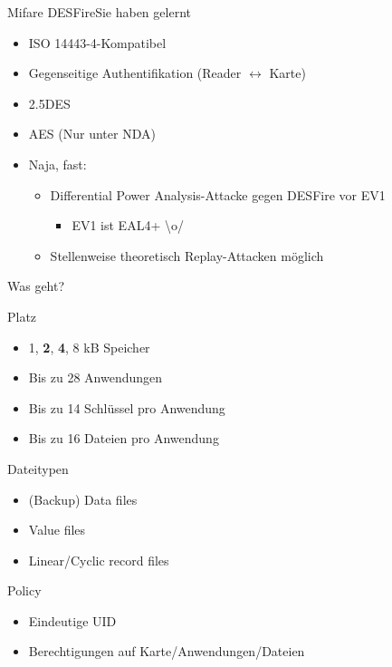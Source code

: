 \documentclass{beamer}
\begin{document}
\begin{frame}{Mifare DESFire}{Sie haben gelernt}
  \begin{itemize}
  \item ISO 14443-4-Kompatibel
  \item Gegenseitige Authentifikation (Reader $\leftrightarrow$ Karte)
  \item 2.5DES
  \item AES (Nur unter NDA)
    \pause
  \item Naja, fast:
    \begin{itemize}
    \item Differential Power Analysis-Attacke gegen DESFire vor EV1
      \begin{itemize}
      \item EV1 ist EAL4+ {\textbackslash}o/
      \end{itemize}
    \item Stellenweise theoretisch Replay-Attacken m\"oglich
    \end{itemize}
  \end{itemize}
\end{frame}

\begin{frame}{Was geht?}
  \begin{block}{Platz}
    \begin{itemize}
    \item 1, \textbf{2}, \textbf{4}, 8 kB Speicher
    \item Bis zu 28 Anwendungen
    \item Bis zu 14 Schl\"ussel pro Anwendung
    \item Bis zu 16 Dateien pro Anwendung
    \end{itemize}
  \end{block}
  \pause
  \begin{block}{Dateitypen}
    \begin{itemize}
    \item (Backup) Data files
    \item Value files
    \item Linear/Cyclic record files
    \end{itemize}
  \end{block}
  \pause
  \begin{block}{Policy}
    \begin{itemize}
    \item Eindeutige UID
    \item Berechtigungen auf Karte/Anwendungen/Dateien
    \end{itemize}
  \end{block}
\end{frame}
\end{document}
